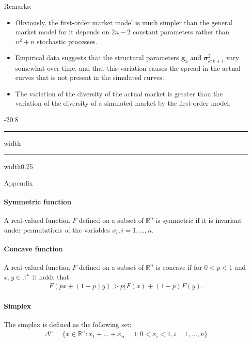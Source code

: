 \documentclass[a4paper,landscape,8pt,fleqn]{scrartcl}
\makeatletter
\renewcommand{\section}{\@startsection{section}{1}{0mm}%
{-2\baselineskip}{0.8\baselineskip}%
{\hrule depth 0.2pt width\columnwidth\hrule depth1.5pt
width0.25\columnwidth\vspace*{1.2em}\Large\bfseries}}
\makeatother
\begin{document}
\begin{multicols*}{3}
Remarks:
\begin{itemize}
\item Obviously, the first-order market model is much simpler than the general market model for it depends on $2n-2$ constant parameters rather than $n^2+n$ stochastic processes.
\item Empirical data suggests that the structural parameters $\pmb{g}_k$ and $\pmb{\sigma}_{k:k+1}^2$ vary somewhat over time, and that this variation causes the spread in the actual curves that is not present in the simulated curves.
\item The variation of the diversity of the actual market is greater than the variation of the diversity of a simulated market by the first-order model.
\end{itemize}

\columnbreak

\section{Appendix}

\paragraph{Symmetric function}

A real-valued function $F$ defined on a subset of $\mathbb{R}^n$ is symmetric if it is invariant under permutations of the variables $x_i, i = 1, \ldots, n$.

\paragraph{Concave function}

A real-valued function $F$ defined on a subset of $\mathbb{R}^n$ is concave if for $0<p<1$ and $x,y \in \mathbb{R}^n$ it holds that
\begin{align*}
F(p x + (1-p) y) > p (F(x) + (1-p) F(y).
\end{align*}

\paragraph{Simplex}

The simplex is defined as the following set:
\begin{align*}
\Delta^n = \lbrace x \in \mathbb{R}^n : x_1 + \ldots + x_n = 1 ; 0 < x_i < 1 , i = 1, \ldots, n \rbrace
\end{align*}


\end{multicols*}
\end{document}
